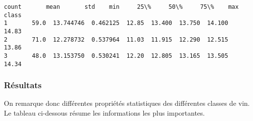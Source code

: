 \documentclass[11pt]{article}
\begin{document}
    \begin{Verbatim}[commandchars=\\\{\}]
       count       mean       std    min     25\%     50\%     75\%    max
class                                                                  
1       59.0  13.744746  0.462125  12.85  13.400  13.750  14.100  14.83
2       71.0  12.278732  0.537964  11.03  11.915  12.290  12.515  13.86
3       48.0  13.153750  0.530241  12.20  12.805  13.165  13.505  14.34

    \end{Verbatim}

    \hypertarget{ruxe9sultats}{%
\subsubsection{Résultats}\label{ruxe9sultats}}

    On remarque donc différentes propriétés statistiques des différentes
classes de vin. Le tableau ci-dessous résume les informations les plus
importantes.
\end{document}
